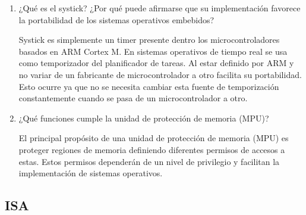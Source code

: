\documentclass[12pt, a4paper]{article}
\makeatletter
\newcommand\setItemnumber[1]{\setcounter{enum\romannumeral\@enumdepth}{\numexpr#1-1\relax}}
\makeatother
\begin{document}
\begin{enumerate}
    
    \setItemnumber{17}
    \item ¿Qué es el systick? ¿Por qué puede afirmarse que su implementación favorece la portabilidad 
    de los sistemas operativos embebidos?
    
    Systick es simplemente un timer presente dentro los microcontroladores basados en ARM Cortex M. 
    En sistemas operativos de tiempo real se usa como temporizador del planificador de tareas. Al estar
    definido por ARM y no variar de un fabricante de microcontrolador a otro facilita
    su portabilidad. Esto ocurre ya que no se necesita cambiar esta fuente de temporización 
    constantemente cuando se pasa de un microcontrolador a otro.
    
    \setItemnumber{18}
    \item ¿Qué funciones cumple la unidad de protección de memoria (MPU)?
    
    El principal propósito de una unidad de protección de memoria (MPU) es proteger regiones de
    memoria definiendo diferentes permisos de accesos a estas. Estos permisos dependerán de un 
    nivel de privilegio y facilitan la implementación de sistemas operativos.
    
\end{enumerate}

\subsection{ISA}
\end{document}
